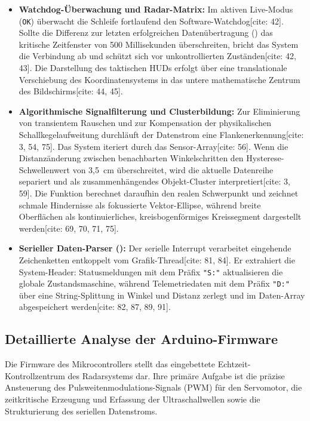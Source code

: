 \begin{itemize}
	\item \textbf{Watchdog-Überwachung und Radar-Matrix:} Im aktiven Live-Modus (\texttt{OK}) überwacht die Schleife fortlaufend den Software-Watchdog[cite: 42]. Sollte die Differenz zur letzten erfolgreichen Datenübertragung () das kritische Zeitfenster von 500 Millisekunden überschreiten, bricht das System die Verbindung ab und schützt sich vor unkontrollierten Zuständen[cite: 42, 43]. Die Darstellung des taktischen HUDs erfolgt über eine translationale Verschiebung des Koordinatensystems in das untere mathematische Zentrum des Bildschirms[cite: 44, 45].
	\item \textbf{Algorithmische Signalfilterung und Clusterbildung:} Zur Eliminierung von transientem Rauschen und zur Kompensation der physikalischen Schallkegelaufweitung durchläuft der Datenstrom eine Flankenerkennung[cite: 3, 54, 75]. Das System iteriert durch das Sensor-Array[cite: 56]. Wenn die Distanzänderung zwischen benachbarten Winkelschritten den Hysterese-Schwellenwert von 3,5~cm überschreitet, wird die aktuelle Datenreihe separiert und als zusammenhängendes Objekt-Cluster interpretiert[cite: 3, 59]. Die Funktion  berechnet daraufhin den realen Schwerpunkt und zeichnet schmale Hindernisse als fokussierte Vektor-Ellipse, während breite Oberflächen als kontinuierliches, kreisbogenförmiges Kreissegment dargestellt werden[cite: 69, 70, 71, 75].
	\item \textbf{Serieller Daten-Parser ():} Der serielle Interrupt verarbeitet eingehende Zeichenketten entkoppelt vom Grafik-Thread[cite: 81, 84]. Er extrahiert die System-Header: Statusmeldungen mit dem Präfix \texttt{"S:"} aktualisieren die globale Zustandsmaschine, während Telemetriedaten mit dem Präfix \texttt{"D:"} über eine String-Splittung in Winkel und Distanz zerlegt und im Daten-Array abgespeichert werden[cite: 82, 87, 89, 91].
\end{itemize}


\subsection{Detaillierte Analyse der Arduino-Firmware}
\label{sec:Analyse_Arduino_Code}

Die Firmware des Mikrocontrollers stellt das eingebettete Echtzeit-Kontrollzentrum des Radarsystems dar. Ihre primäre Aufgabe ist die präzise Ansteuerung des Pulsweitenmodulations-Signals (PWM) für den Servomotor, die zeitkritische Erzeugung und Erfassung der Ultraschallwellen sowie die Strukturierung des seriellen Datenstroms.

